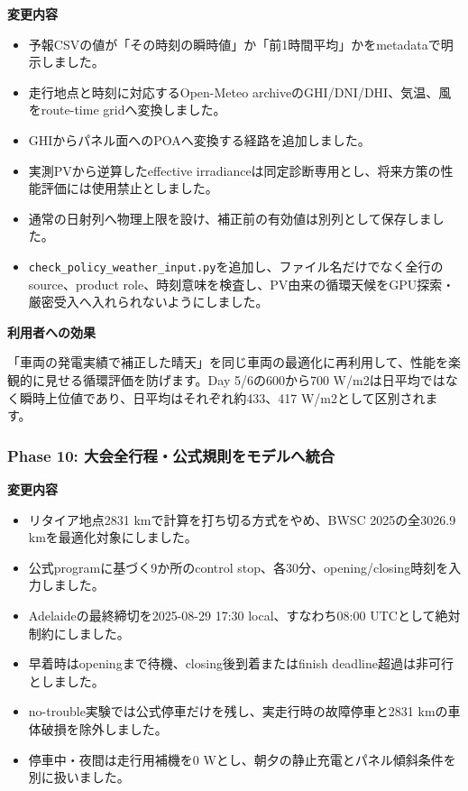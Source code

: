 \documentclass[
  japanese,
  a4paper,
  11pt]{article}
\providecommand{\tightlist}{%
  \setlength{\itemsep}{0pt}\setlength{\parskip}{0pt}}
\begin{document}
\textbf{変更内容}

\begin{itemize}
\tightlist
\item
  予報CSVの値が「その時刻の瞬時値」か「前1時間平均」かをmetadataで明示しました。
\item
  走行地点と時刻に対応するOpen-Meteo
  archiveのGHI/DNI/DHI、気温、風をroute-time gridへ変換しました。
\item
  GHIからパネル面へのPOAへ変換する経路を追加しました。
\item
  実測PVから逆算したeffective
  irradianceは同定診断専用とし、将来方策の性能評価には使用禁止としました。
\item
  通常の日射列へ物理上限を設け、補正前の有効値は別列として保存しました。
\item
  \texttt{check\_policy\_weather\_input.py}を追加し、ファイル名だけでなく全行のsource、product
  role、時刻意味を検査し、PV由来の循環天候をGPU探索・厳密受入へ入れられないようにしました。
\end{itemize}

\textbf{利用者への効果}

「車両の発電実績で補正した晴天」を同じ車両の最適化に再利用して、性能を楽観的に見せる循環評価を防げます。Day
5/6の600から700
W/m2は日平均ではなく瞬時上位値であり、日平均はそれぞれ約433、417
W/m2として区別されます。

\subsubsection{Phase 10:
大会全行程・公式規則をモデルへ統合}\label{phase-10-ux5927ux4f1aux5168ux884cux7a0bux516cux5f0fux898fux5247ux3092ux30e2ux30c7ux30ebux3078ux7d71ux5408}

\textbf{変更内容}

\begin{itemize}
\tightlist
\item
  リタイア地点2831 kmで計算を打ち切る方式をやめ、BWSC 2025の全3026.9
  kmを最適化対象にしました。
\item
  公式programに基づく9か所のcontrol
  stop、各30分、opening/closing時刻を入力しました。
\item
  Adelaideの最終締切を2025-08-29 17:30 local、すなわち08:00
  UTCとして絶対制約にしました。
\item
  早着時はopeningまで待機、closing後到着またはfinish
  deadline超過は非可行としました。
\item
  no-trouble実験では公式停車だけを残し、実走行時の故障停車と2831
  kmの車体破損を除外しました。
\item
  停車中・夜間は走行用補機を0
  Wとし、朝夕の静止充電とパネル傾斜条件を別に扱いました。
\end{itemize}
\end{document}
